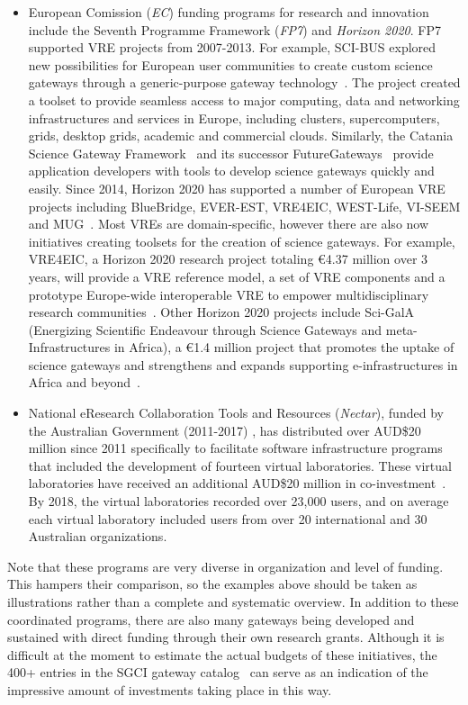 \documentclass[review]{elsarticle}
\newcommand{\changedtext}[1]{
	{#1}
}
\begin{document}
\begin{itemize}
\item European Comission (\emph{EC}) funding programs for research and innovation include the Seventh Programme Framework (\emph{FP7}) and \emph{Horizon 2020}. FP7 supported VRE projects from 2007-2013.
For example, SCI-BUS explored new possibilities for European user communities to create custom science gateways through a generic-purpose gateway technology~\cite{kacsuk2014-18}. 
The project created a toolset to provide seamless access to major computing, data and networking infrastructures and services in Europe, including clusters, supercomputers, grids, desktop grids, academic and commercial clouds. Similarly, the Catania Science Gateway Framework~\cite{decide-19} and its successor FutureGateways~\cite{futuregateway} provide application developers with tools to develop science gateways quickly and easily. 
Since 2014, Horizon 2020 has supported a number of European VRE projects including BlueBridge, EVER-EST, VRE4EIC, WEST-Life, VI-SEEM and MUG~\cite{h2020-projects-20}. 
Most VREs are domain-specific, however there are also now initiatives creating toolsets for the creation of science gateways. 
For example, VRE4EIC, a Horizon 2020 research project totaling \euro 4.37 million over 3 years, will provide a VRE reference model, a set of VRE components and a prototype Europe-wide interoperable VRE to empower multidisciplinary research communities~\cite{vre4eic-21}. 
Other Horizon 2020 projects include Sci-GalA (Energizing Scientific Endeavour through Science Gateways and meta-Infrastructures in Africa), a \euro 1.4 million project that promotes the uptake of science gateways and strengthens and expands supporting e-infrastructures in Africa and beyond~\cite{sci-gaia-22}.

\item National eResearch Collaboration Tools and Resources (\emph{Nectar}), funded by the Australian Government \changedtext{(2011-2017)}, has distributed over AUD\$20 million since 2011 specifically to facilitate software infrastructure programs that included the development of fourteen virtual laboratories. These virtual laboratories have received an additional AUD\$20 million in co-investment~\cite{nectar-impact-3}. By 2018, the virtual laboratories recorded over 23,000 users, and on average each virtual laboratory included users from over 20 international and 30 Australian organizations.

\end{itemize}

\changedtext{Note that these programs are very diverse in organization and level of funding. This hampers their comparison, so the examples above should be taken as illustrations rather than a complete and systematic overview.
In addition to these coordinated programs, there are also many gateways being developed and sustained with direct funding through their own research grants. Although it is difficult at the moment to estimate the actual budgets of these initiatives, the 400+ entries in the SGCI gateway catalog~\cite{sgci-16} can serve as an indication of the impressive amount of investments taking place in this way.}
\end{document}
